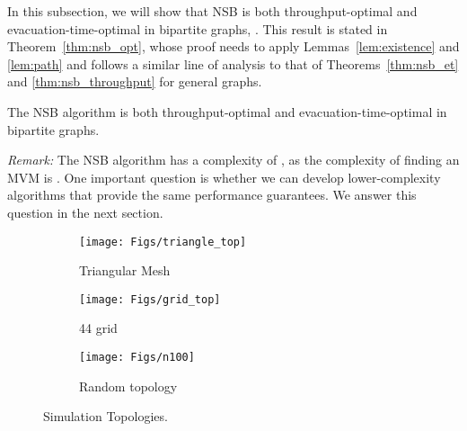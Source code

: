 \documentclass[10pt,journal,compsoc]{IEEEtran}
\newcommand{\HIGH}[1]{{\color{black}{#1}}}
\newcommand{\high}[1]{{\color{black}{#1}}}
\begin{document}
In this subsection, we will show that NSB is both throughput-optimal and evacuation-time-optimal in bipartite 
graphs, \high{where there are no odd-size cycles}. This result is stated in Theorem~\ref{thm:nsb_opt},
whose proof needs to apply Lemmas~\ref{lem:existence} and \ref{lem:path} and follows 
a similar line of analysis to that of Theorems~\ref{thm:nsb_et} and \ref{thm:nsb_throughput} for general graphs.
\HIGH{The detailed proof is provided in the appendix for completeness.}


\begin{theorem}
\label{thm:nsb_opt}
The NSB algorithm is both throughput-optimal and evacuation-time-optimal in bipartite graphs. 
\end{theorem}





\emph{Remark:} The NSB algorithm has a complexity of , as the complexity of finding 
an MVM is  \cite{spencer84}. One important question is whether we can develop 
lower-complexity algorithms that provide the same performance guarantees. We answer this question in the next section.

\begin{figure*}[t!]
        \centering
        \begin{subfigure}[b]{0.3\linewidth}
                \texttt{[image: Figs/triangle\_top]}
                \caption{Triangular Mesh}
                \label{fig:triangle_top}
        \end{subfigure}\qquad
        \begin{subfigure}[b]{0.3\linewidth}
                \texttt{[image: Figs/grid\_top]}
                \caption{44 grid}
                \label{fig:grid_top}
        \end{subfigure}
	\qquad
	\begin{subfigure}[b]{0.3\linewidth}
\texttt{[image: Figs/n100]}
                \caption{Random topology}
                \label{fig:random_top}
        \end{subfigure}  
        \caption{Simulation Topologies.}
        \label{fig:topologies}
\end{figure*}
\end{document}
